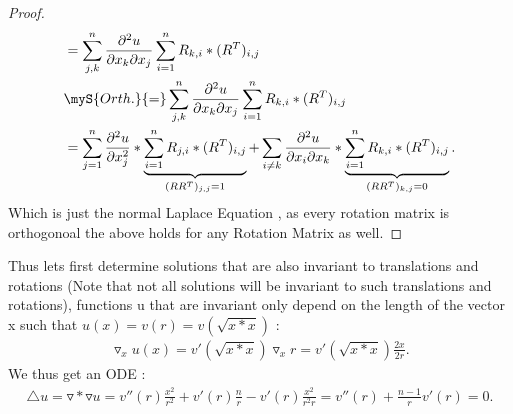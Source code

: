 \begin{proof}[Proof]
\begin{align*}
                                                                       &=    \sum_{j,k}^{n}\frac{\partial ^2 u}{\partial x_k \partial x_j} \sum_{i=1}^{n} R_{k,i}*(R^{T})_{i,j} \\
                                                                       &\myS{Orth.}{=}  \sum_{j,k}^{n}\frac{\partial ^2 u}{\partial x_k \partial x_j} \sum_{i=1}^{n} R_{k,i}*(R^{T})_{i,j} \\
                                                                       &= \sum_{j=1}^{n}  \frac{\partial ^2  u}{\partial x_j^2} * \underbrace{\sum_{i=1}^{n} R_{j,i}*(R^{T})_{i,j}}_{(RR^{T})_{j,j} = 1} + \sum_{i\neq k } \frac{\partial ^2  u}{\partial x_i \partial x_k} * \underbrace{\sum_{i=1}^{n} R_{k,i}*(R^{T})_{i,j}}_{(RR^{T})_{k,j} = 0}
  .\end{align*}
  Which is just the normal Laplace Equation , as every rotation matrix is orthogonoal the above holds for any Rotation Matrix as well.
\end{proof}
Thus lets first determine solutions that are also invariant to translations and rotations (Note that not all solutions will be invariant to such translations and rotations), 
functions u that are invariant only depend on the length of the vector x such that $u(x) = v(r) = v(\sqrt{x*x} )$ : 
\begin{align*}
  \triangledown_x u(x) = v'(\sqrt{x*x} )\triangledown_x r = v'(\sqrt{x*x} ) \frac{2x}{2r}
.\end{align*}
We thus get an ODE : 
\begin{align*}
  \triangle u = \triangledown * \triangledown u =  v''(r) \frac{x^2}{r^2} + v'(r) \frac{n}{r} - v'(r)\frac{x^2}{r^2r} = v''(r) + \frac{n-1}{r}v'(r) = 0 
.\end{align*}
